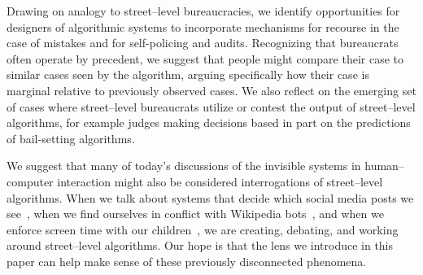 \documentclass[street-level_algorithms]{subfiles}
\begin{document}
Drawing on analogy to street--level bureaucracies, we identify opportunities for designers of algorithmic systems to incorporate mechanisms for recourse in the case of mistakes and for self-policing and audits.
Recognizing that bureaucrats often operate by precedent, we suggest that
people might compare their case to similar cases seen by the algorithm,
arguing specifically how their case is marginal relative to previously observed cases.
We also reflect on the emerging set of cases where street--level bureaucrats utilize or contest the output of street--level algorithms, for example judges making decisions based in part on the predictions of bail-setting algorithms.

We suggest that many of today's discussions of the invisible systems in human--computer interaction might also be considered interrogations of street--level algorithms.
When we talk about systems that decide which social media posts we see~\cite{Eslami:2015:IAA:2702123.2702556},
when we find ourselves in conflict with Wikipedia bots~\cite{geiger2018lives,Geiger:2013:LBW:2491055.2491061},
and when we enforce screen time with our children~\cite{Hiniker:2016:STT:2858036.2858278},
we are creating, debating, and working around street--level algorithms.
Our hope is that the lens we introduce in this paper can help make sense of these previously disconnected phenomena.


%   
%   
\end{document}
